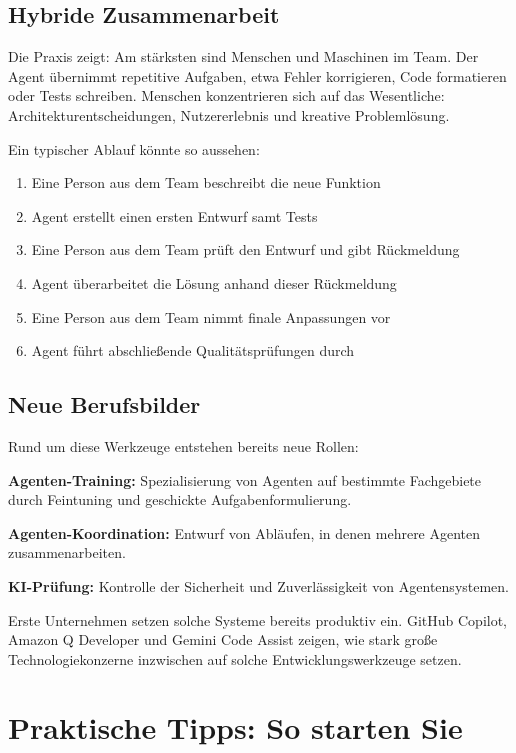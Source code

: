 \subsection{Hybride Zusammenarbeit}

Die Praxis zeigt: Am stärksten sind Menschen und Maschinen im Team. Der Agent übernimmt repetitive Aufgaben, etwa Fehler korrigieren, Code formatieren oder Tests schreiben. Menschen konzentrieren sich auf das Wesentliche: Architekturentscheidungen, Nutzererlebnis und kreative Problemlösung.

Ein typischer Ablauf könnte so aussehen:
\begin{enumerate}
  \item Eine Person aus dem Team beschreibt die neue Funktion
  \item Agent erstellt einen ersten Entwurf samt Tests
  \item Eine Person aus dem Team prüft den Entwurf und gibt Rückmeldung
  \item Agent überarbeitet die Lösung anhand dieser Rückmeldung
  \item Eine Person aus dem Team nimmt finale Anpassungen vor
  \item Agent führt abschließende Qualitätsprüfungen durch
\end{enumerate}

\subsection{Neue Berufsbilder}

Rund um diese Werkzeuge entstehen bereits neue Rollen:

\textbf{Agenten-Training:} Spezialisierung von Agenten auf bestimmte Fachgebiete durch Feintuning und geschickte Aufgabenformulierung.

\textbf{Agenten-Koordination:} Entwurf von Abläufen, in denen mehrere Agenten zusammenarbeiten.

\textbf{KI-Prüfung:} Kontrolle der Sicherheit und Zuverlässigkeit von Agentensystemen.

Erste Unternehmen setzen solche Systeme bereits produktiv ein. GitHub Copilot, Amazon Q Developer und Gemini Code Assist zeigen, wie stark große Technologiekonzerne inzwischen auf solche Entwicklungswerkzeuge setzen.~\cite{github2026copilot,aws2026qdeveloper,google2026geminicodeassist}


\section{Praktische Tipps: So starten Sie}

